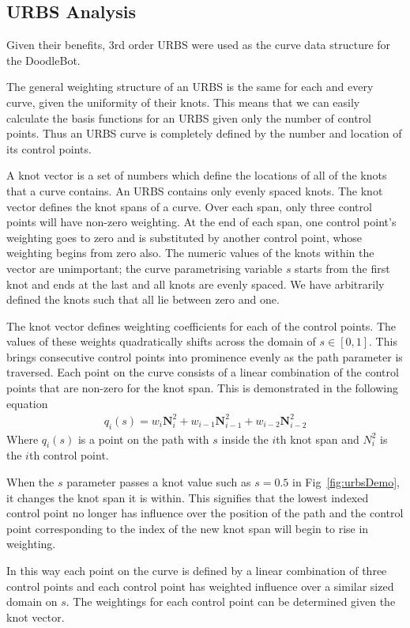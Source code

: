 \subsection{URBS Analysis}
Given their benefits, 3rd order URBS were used as the curve data structure for the DoodleBot. 

The general weighting structure of an URBS is the same for each and every curve, given the uniformity of their knots. This means that we can easily calculate the basis functions for an URBS given only the number of control points. Thus an URBS curve is completely defined by the number and location of its control points.

A knot vector is a set of numbers which define the locations of all of the knots that a curve contains. An URBS contains only evenly spaced knots. The knot vector defines the knot spans of a curve. Over each span, only three control points will have non-zero weighting. At the end of each span, one control point's weighting goes to zero and is substituted by another control point, whose weighting begins from zero also. The numeric values of the knots within the vector are unimportant; the curve parametrising variable $s$ starts from the first knot and ends at the last and all knots are evenly spaced. We have arbitrarily defined the knots such that all lie between zero and one.

The knot vector defines weighting coefficients for each of the control points. The values of these weights quadratically shifts across the domain of $s \in [0, 1]$. This brings consecutive control points into prominence evenly as the path parameter is traversed. Each point on the curve consists of a linear combination of the control points that are non-zero for the knot span. This is demonstrated in the following equation
\begin{align*}
q_i(s) = w_i\textbf{N}_i^2 + w_{i-1}\textbf{N}_{i-1}^2 + w_{i-2}\textbf{N}_{i-2}^2
\end{align*} 
Where $q_i(s)$ is a point on the path with $s$ inside the $i$th knot span and $N_i^2$ is the $i$th control point.

When the $s$ parameter passes a knot value such as $s = 0.5$ in Fig~\ref{fig:urbsDemo}, it changes the knot span it is within. This signifies that the lowest indexed control point no longer has influence over the position of the path and the control point corresponding to the index of the new knot span will begin to rise in weighting.

In this way each point on the curve is defined by a linear combination of three control points and each control point has weighted influence over a similar sized domain on $s$. The weightings for each control point can be determined given the knot vector.

